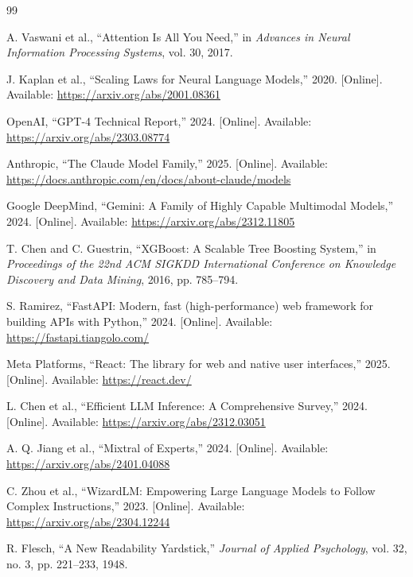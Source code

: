 \documentclass[oneside,12pt,a4paper]{report}
\begin{document}
\begin{thebibliography}{99}

A. Vaswani et al., ``Attention Is All You Need,'' in \textit{Advances in Neural Information Processing Systems}, vol. 30, 2017.

J. Kaplan et al., ``Scaling Laws for Neural Language Models,'' 2020. [Online]. Available: \url{https://arxiv.org/abs/2001.08361}

OpenAI, ``GPT-4 Technical Report,'' 2024. [Online]. Available: \url{https://arxiv.org/abs/2303.08774}

Anthropic, ``The Claude Model Family,'' 2025. [Online]. Available: \url{https://docs.anthropic.com/en/docs/about-claude/models}

Google DeepMind, ``Gemini: A Family of Highly Capable Multimodal Models,'' 2024. [Online]. Available: \url{https://arxiv.org/abs/2312.11805}

T. Chen and C. Guestrin, ``XGBoost: A Scalable Tree Boosting System,'' in \textit{Proceedings of the 22nd ACM SIGKDD International Conference on Knowledge Discovery and Data Mining}, 2016, pp. 785--794.

S. Ramirez, ``FastAPI: Modern, fast (high-performance) web framework for building APIs with Python,'' 2024. [Online]. Available: \url{https://fastapi.tiangolo.com/}

Meta Platforms, ``React: The library for web and native user interfaces,'' 2025. [Online]. Available: \url{https://react.dev/}

L. Chen et al., ``Efficient LLM Inference: A Comprehensive Survey,'' 2024. [Online]. Available: \url{https://arxiv.org/abs/2312.03051}

A. Q. Jiang et al., ``Mixtral of Experts,'' 2024. [Online]. Available: \url{https://arxiv.org/abs/2401.04088}

C. Zhou et al., ``WizardLM: Empowering Large Language Models to Follow Complex Instructions,'' 2023. [Online]. Available: \url{https://arxiv.org/abs/2304.12244}

R. Flesch, ``A New Readability Yardstick,'' \textit{Journal of Applied Psychology}, vol. 32, no. 3, pp. 221--233, 1948.


\end{thebibliography}
\end{document}
